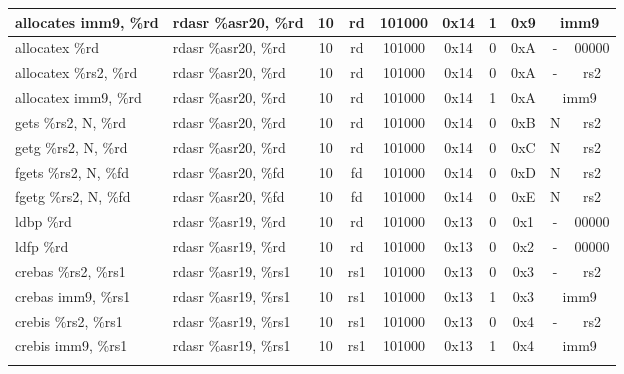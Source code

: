 \documentclass[a4paper,11pt]{article}
\begin{document}
\begin{table}
\begin{center}
{\begin{tabular}{|>{\ttfamily}l|>{\ttfamily}l||c|c|c|c|c|c|c|c|}
allocates  imm9, \%rd & rdasr \%asr20, \%rd  & 10 &   rd & 101000 & 0x14 & 1 & 0x9 & \multicolumn{2}{c|}{imm9} \\ \cline{9-10}
allocatex \%rd        & rdasr \%asr20, \%rd  & 10 &   rd & 101000 & 0x14 & 0 & 0xA & - & 00000 \\
allocatex \%rs2, \%rd & rdasr \%asr20, \%rd  & 10 &   rd & 101000 & 0x14 & 0 & 0xA & - & rs2 \\ \cline{9-10}
allocatex  imm9, \%rd & rdasr \%asr20, \%rd  & 10 &   rd & 101000 & 0x14 & 1 & 0xA & \multicolumn{2}{c|}{imm9} \\ \cline{9-10}
gets \%rs2, N, \%rd   & rdasr \%asr20, \%rd  & 10 &   rd & 101000 & 0x14 & 0 & 0xB & N & rs2 \\
getg \%rs2, N, \%rd   & rdasr \%asr20, \%rd  & 10 &   rd & 101000 & 0x14 & 0 & 0xC & N & rs2 \\
fgets \%rs2, N, \%fd  & rdasr \%asr20, \%fd  & 10 &   fd & 101000 & 0x14 & 0 & 0xD & N & rs2 \\
fgetg \%rs2, N, \%fd  & rdasr \%asr20, \%fd  & 10 &   fd & 101000 & 0x14 & 0 & 0xE & N & rs2 \\

\hline \hline
ldbp \%rd             & rdasr \%asr19, \%rd  & 10 &   rd & 101000 & 0x13 & 0 & 0x1 & - & 00000 \\
ldfp \%rd             & rdasr \%asr19, \%rd  & 10 &   rd & 101000 & 0x13 & 0 & 0x2 & - & 00000 \\
crebas \%rs2, \%rs1   & rdasr \%asr19, \%rs1 & 10 &  rs1 & 101000 & 0x13 & 0 & 0x3 & - & rs2 \\ \cline{9-10}
crebas  imm9, \%rs1   & rdasr \%asr19, \%rs1 & 10 &  rs1 & 101000 & 0x13 & 1 & 0x3 & \multicolumn{2}{c|}{imm9} \\ \cline{9-10}
crebis \%rs2, \%rs1   & rdasr \%asr19, \%rs1 & 10 &  rs1 & 101000 & 0x13 & 0 & 0x4 & - & rs2 \\ \cline{9-10}
crebis  imm9, \%rs1   & rdasr \%asr19, \%rs1 & 10 &  rs1 & 101000 & 0x13 & 1 & 0x4 & \multicolumn{2}{c|}{imm9} \\ \cline{9-10}


\end{tabular}}
\end{center}
\end{table}
\end{document}
